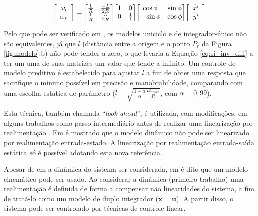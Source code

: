 \begin{equation}
	\label{eq:si_inv_diff}
	\mleft[ 
	\begin{array}{c c}
	\omega_l \\ \omega_r
	\end{array}
	\mright] = \mleft[
	\begin{matrix}
		  \frac{1}{R} & \frac{-L}{2R} \\
		  \frac{1}{R} & \frac{L}{2R} \\
	\end{matrix}
	\mright] \mleft[
	\begin{matrix}
		  1 & 0 \\
		  0 & \frac{1}{l} \\
	\end{matrix}
	\mright] \mleft[
	\begin{matrix}
		  \cos{\phi} & \sin{\phi} \\
		  -\sin{\phi} & \cos{\phi} \\
	\end{matrix}
	\mright] \mleft[ 
	\begin{array}{c c}
	\dot{x'} \\ \dot{y'}
	\end{array}
	\mright]
\end{equation}

Pelo que pode ser verificado em , os modelos
uniciclo e de integrador-único não são equivalentes, já que $l$ (distância 
entre a origem e o ponto $P_r$ da Figura \ref{fig:modelo}.b) não pode tender
a zero, o que levaria a Equação \ref{eq:si_inv_diff} a ter um uma de suas matrizes 
um valor que tende a infinito. Um controle de modelo preditivo é estabelecido para 
ajustar $l$ a fim de obter uma resposta que sacrifique o mínimo possível em 
precisão e manobrabilidade, comparando com uma escolha estática de parâmetro 
($l = \sqrt{\frac{1-\alpha}{\alpha}\frac{Lv_{max}}{R}}$, 
com $\alpha = 0,99$). 

Esta técnica, também chamada ``\textit{look-ahead}'', é utilizada, com
modificações, em alguns trabalhos como passo intermediário antes de realizar uma
linearização por realimentação \cite{art:feedlin_lookahead, art:novel}. Em
 é mostrado que o modelo dinâmico não pode ser
linearizado por realimentação entrada-estado. A linearização por realimentação
entrada-saída estática só é possível adotando esta nova referência.

Apesar de em  a dinâmica do sistema ser
considerada, em  é dito que um modelo cinemático pode ser
usado. Ao considerar a dinâmica (primeiro trabalho) uma realimentação é
definida de forma a compensar não linearidades do sistema, a fim de tratá-lo
como um modelo de duplo integrador ($\mathbf{\ddot{x}} = \mathbf{u}$). A partir
disso, o sistema pode ser controlado por técnicas de controle linear. 

